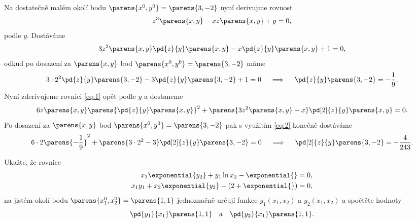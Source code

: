 \documentclass[answers]{exam}
\begin{document}
\begin{questions}
\begin{solution}
		Na dostatečně malém okolí bodu $\parens{x^0, y^0} = \parens{3, -2}$ nyní derivujme rovnost
		\begin{equation*}
			z^3\parens{x,y} - x z\parens{x, y} + y = 0,
		\end{equation*}
		podle $y$. Dostáváme
		\begin{equation}
			\label{eq:1}
			3 z^2\parens{x,y} \pd{z}{y}\parens{x,y} - x \pd{z}{y}\parens{x,y} + 1 = 0,
		\end{equation}
		odkud po dosazení za $\parens{x, y}$ bod $\parens{x^0, y^0} = \parens{3, -2}$ máme
		\begin{equation}
			\label{eq:2}
			3 \cdot 2^2 \pd{z}{y} \parens{3, -2} - 3 \pd{z}{y} \parens{3, -2} + 1 = 0
			\quad 
			\implies
			\quad
			\pd{z}{y} \parens{3, -2}
			=
			-
			\frac{1}{9}.
		\end{equation}
		Nyní zderivujeme rovnici \eqref{eq:1} opět podle $y$ a dostaneme
		\begin{equation*}
			6 z\parens{x,y} \parens{\pd{z}{y}\parens{x,y}}^2 + \parens{3z^2\parens{x,y} - x} \pd[2]{z}{y}\parens{x,y} = 0.
		\end{equation*}
		Po dosazení za $\parens{x, y}$ bod $\parens{x^0, y^0} = \parens{3, -2}$ pak s využitím \eqref{eq:2} konečně dostáváme
		\begin{equation*}
			6 \cdot 2 \parens{-\frac{1}{9}}^2 + \parens{3 \cdot 2^2 - 3} \pd[2]{z}{y}\parens{3, -2} = 0
			\quad
			\implies
			\quad
			\pd[2]{z}{y}\parens{3, -2} = -\frac{4}{243}.
		\end{equation*}
	\end{solution}
	
  \question 
  	Ukažte, že rovnice 
    \begin{align*}
      x_1\exponential{y_2} + y_1 \ln x_2 - \exponential{} &= 0, \\
      x_1 y_1 + x_2 \exponential{y_2} - (2 + \exponential{} )&=0,
    \end{align*}
    na jistém okolí bodu $\parens{x_1^0, x_2^0} = \parens{1, 1}$ jednoznačně určují funkce $y_1(x_1, x_2)$ a $y_2(x_1, x_2)$ a spočtěte hodnoty
    \begin{equation*}
    	\pd{y_1}{x_1} \parens{1, 1} \quad \text{a} \quad \pd{y_2}{x_1} \parens{1, 1}.
    \end{equation*}
	

\end{questions}
\end{document}
